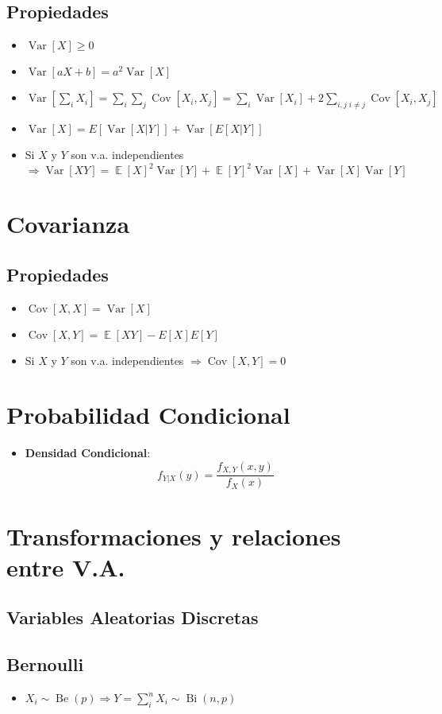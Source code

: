 \documentclass[pdftex,11pt,a4paper]{article}
\DeclareMathOperator{\Var}{Var}
\DeclareMathOperator{\E}{\mathbb{E}}
\DeclareMathOperator{\Bi}{Bi}
\DeclareMathOperator{\Be}{Be}
\DeclareMathOperator{\Cov}{Cov}
\begin{document}
\subsection{Propiedades}
\begin{itemize}
	\item $\Var[X]\geq0$
	\item $\Var[aX+b]=a^2\Var[X]$ 
	\item $\Var[\sum_i X_i] = \sum_i\sum_j \Cov[X_i,X_j] = \sum_i \Var[X_i]  + 2\sum_{i,j\; i \neq j}\Cov[X_i,X_j]$
	\item $\Var[X] = E[\Var[X|Y]]+\Var[E[X|Y]]$
	\item Si $X$ y $Y$ son v.a. independientes $\Rightarrow \Var[XY] = \E[X]^2\Var[Y] + \E[Y]^2\Var[X]+ \Var[X]\Var[Y]$
\end{itemize}

\section{Covarianza}
\subsection{Propiedades}
\begin{itemize}
	\item $\Cov[X,X] = \Var[X]$
	\item $\Cov[X,Y] = \E[XY] - E[X]E[Y]$
	\item Si $X$ y $Y$ son v.a. independientes $\Rightarrow \Cov[X,Y]  =0 $ 
\end{itemize}

\section{Probabilidad Condicional}
	\begin{itemize}
		\item \textbf{Densidad Condicional}: $$f_{Y|X}(y) = \dfrac{f_{X,Y}(x,y)}{f_X(x)}$$
	\end{itemize}
	
\section{Transformaciones y relaciones entre V.A.}
\subsection{Variables Aleatorias Discretas}
\subsection{Bernoulli}
\begin{itemize}
	\item $X_i \sim \Be(p) \Rightarrow Y = \sum_i^nX_i \sim \Bi(n,p)$
\end{itemize}
\end{document}
